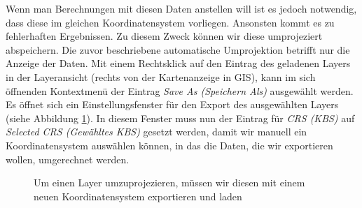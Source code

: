 \documentclass[a4paper,12pt,ngerman]{sphinxmanual}
\begin{document}
Wenn man Berechnungen mit diesen Daten anstellen will ist es jedoch notwendig, dass diese im gleichen Koordinatensystem vorliegen. Ansonsten kommt es zu fehlerhaften Ergebnissen. Zu diesem Zweck können wir diese umprojeziert abspeichern. Die zuvor beschriebene automatische Umprojektion betrifft nur die Anzeige der Daten.
Mit einem Rechtsklick auf den Eintrag des geladenen Layers in der Layeransicht (rechts von der Kartenanzeige in GIS), kann im sich öffnenden Kontextmenü der Eintrag \emph{Save As (Speichern Als)} ausgewählt werden. Es öffnet sich ein Einstellungsfenster für den Export des ausgewählten Layers (siehe Abbildung \hyperref[uebung3:figsaveas]{ \ref*{uebung3:figsaveas}}).
In diesem Fenster muss nun der Eintrag für \emph{CRS (KBS)} auf \emph{Selected CRS (Gewähltes KBS)} gesetzt werden, damit wir manuell ein Koordinatensystem auswählen können, in das die Daten, die wir exportieren wollen, umgerechnet werden.
\begin{figure}[htbp]
\centering
\capstart

\caption{Um einen Layer umzuprojezieren, müssen wir diesen mit einem neuen Koordinatensystem exportieren und laden}\label{uebung3:figsaveas}\end{figure}
\end{document}
